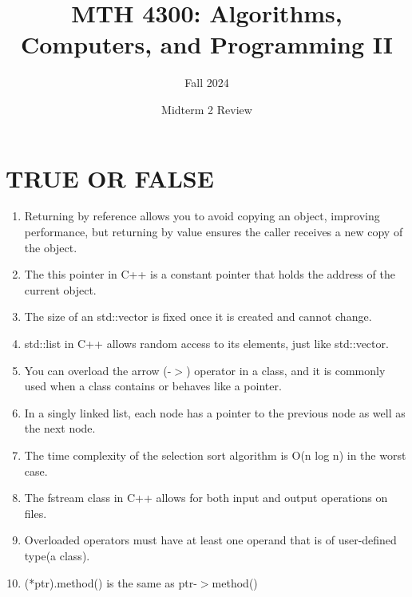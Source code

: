 \documentclass[a4paper]{article}
\title{MTH 4300: Algorithms, Computers, and Programming II}
\author{Fall 2024}
\date{Midterm 2 Review}
\begin{document}
\maketitle


\section{TRUE OR FALSE}
\begin{enumerate}
    \item  Returning by reference allows you to avoid copying an object, 
           improving performance, but returning by value ensures the caller
           receives a new copy of the object.
    \item The this pointer in C++ is a constant pointer that holds the address
          of the current object.
    \item The size of an std::vector is fixed once it is created and cannot change.
    \item std::list in C++ allows random access to its elements, just like std::vector.
    \item You can overload the arrow (-$>$) operator in a class, and it is commonly
          used when a class contains or behaves like a pointer.
    \item In a singly linked list, each node has a pointer to the previous node as well as the next node.
    \item The time complexity of the selection sort algorithm is O(n log n) in the worst case.
    \item The fstream class in C++ allows for both input and output operations on files.
    \item Overloaded operators must have at least one operand that is of user-defined type(a class).
    \item (*ptr).method() is the same as ptr-$>$method()  
\end{enumerate}
\newpage
\end{document}
